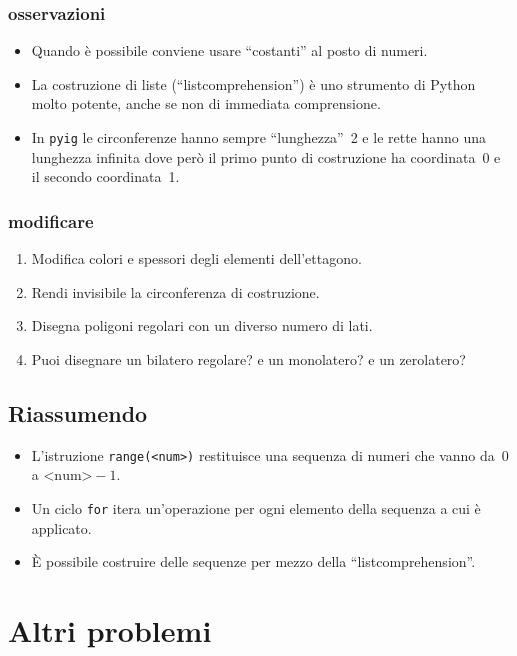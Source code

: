 \subsubsection{osservazioni}

\begin{itemize} [noitemsep]
 \item Quando è possibile conviene usare ``costanti'' al posto di numeri.
 \item La costruzione di liste (``listcomprehension'') è uno strumento di 
Python molto potente, anche se non di immediata comprensione.
 \item In \lstinline{pyig} le circonferenze hanno sempre ``lunghezza''~2 e le 
rette hanno una lunghezza infinita dove però il primo punto di costruzione ha 
coordinata~0 e il secondo coordinata~1.
\end{itemize}

\subsubsection{modificare}

\begin{enumerate} [noitemsep]
 \item Modifica colori e spessori degli elementi dell'ettagono.
 \item Rendi invisibile la circonferenza di costruzione.
 \item Disegna poligoni regolari con un diverso numero di lati.
 \item Puoi disegnare un bilatero regolare? e un monolatero? e un zerolatero?
\end{enumerate}

\subsection{Riassumendo}
\begin{itemize} [noitemsep]
\item L'istruzione \lstinline{range(<num>)} restituisce una sequenza di numeri 
che vanno da~\(0\) a \(\text{<num>}-1\).
\item Un ciclo \lstinline{for} itera un'operazione per ogni elemento della 
sequenza a cui è applicato.
\item È possibile costruire delle sequenze per mezzo della 
``listcomprehension''.
\end{itemize}

\section{Altri problemi}

